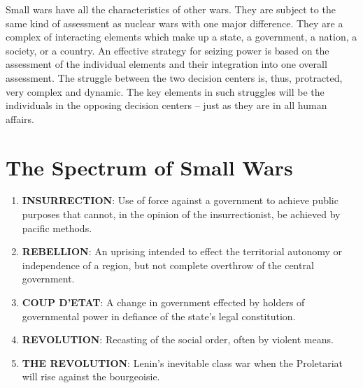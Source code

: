 Small wars have all the characteristics of other wars. They are subject to the same kind of assessment as nuclear wars with one major difference. They are a complex of interacting elements which make up a state, a government, a nation, a society, or a country. An effective strategy for seizing power is based on the assessment of the individual elements and their integration into one overall assessment. The struggle between the two decision centers is, thus, protracted, very complex and dynamic. The key elements in such struggles will be the individuals in the opposing decision centers -- just as they are in all human affairs.

\section{The Spectrum of Small Wars}

\begin{enumerate}
    \item \textbf{INSURRECTION}: Use of force against a government to achieve public purposes that cannot, in the opinion of the insurrectionist, be achieved by pacific methods.
    \item \textbf{REBELLION}: An uprising intended to effect the territorial autonomy or independence of a region, but not complete overthrow of the central government.
    \item \textbf{COUP D'ETAT}: A change in government effected by holders of governmental power in defiance of the state's legal constitution.
    \item \textbf{REVOLUTION}: Recasting of the social order, often by violent means.
    \item \textbf{THE REVOLUTION}: Lenin's inevitable class war when the Proletariat will rise against the bourgeoisie.
\end{enumerate}

